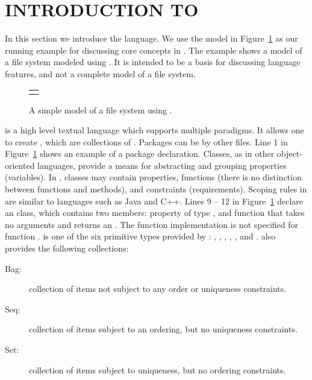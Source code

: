 \section{INTRODUCTION TO \Klang{}}
\label{sec:k-syntax}

In this section we introduce the \Klang{} language. We use the
\Klang{} model in Figure~\ref{fig:fs} as our running example for
discussing core concepts in \Klang{}. The example shows a model of a
file system modeled using \Klang{}. It is intended to be a basis for
discussing language features, and not a complete model of a file
system.

\begin{figure}
  \centering
  \begin{tabular}{c}
    \small
    
    \end{tabular}
  \vspace{0.2cm}
  \caption{A simple model of a file system using \Klang{}.}
  \label{fig:fs}
\end{figure}
  
\Klang{} is a high level textual language which supports multiple
paradigms. It allows one to create , which are
collections of . Packages can be  by
other \Klang{} files. Line 1 in Figure~\ref{fig:fs} shows an example
of a package declaration. Classes, as in other object-oriented
languages, provide a means for abstracting and grouping
properties (variables). In \Klang{}, classes may contain properties,
functions (there is no distinction between functions and methods), and
constraints (requirements). Scoping rules in \Klang{} are similar to
languages such as Java and C++. Lines 9 -- 12 in Figure~\ref{fig:fs}
declare an  class, which contains two members: property
 of type , and function  that takes
no arguments and returns an . The function implementation is
not specified for function .  is one of the
six primitive types provided by \Klang{}: , ,
, , , and . \Klang{}
also provides the following collections:

\begin{description}
\item [Bag:] collection of items not subject to any order
  or uniqueness constraints.
\item [Seq:] collection of items subject to an ordering, but
  no uniqueness constraints.
\item [Set:] collection of items subject to uniqueness, but no
  ordering constraints.
\end{description}

